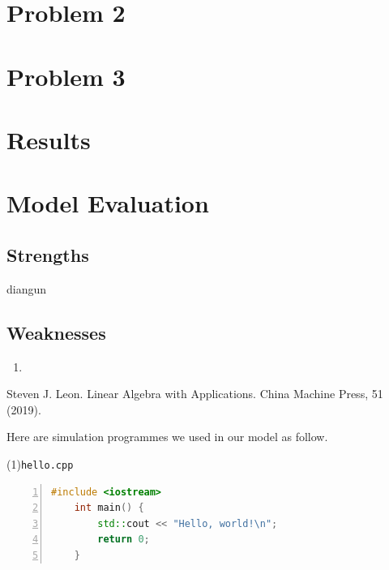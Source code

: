 \documentclass[UTF8]{mcmthesis}
\begin{document}
    \section{Problem 2}
    \section{Problem 3}
    \section{Results}
    \section{Model Evaluation}
        \subsection{Strengths}
diangun
            
        \subsection{Weaknesses}
            \begin{enumerate}
                \item 
            \end{enumerate}


        \begin{thebibliography}{99}
            Steven J. Leon.
            Linear Algebra with Applications.
            China Machine Press, 51 (2019).
        \end{thebibliography}


    \begin{appendices}
        Here are simulation programmes we used in our model as follow.
        
        \vspace{.5em}
        \noindent(1)\quad \verb|hello.cpp|
        \vspace{.5em}
        \begin{lstlisting}[language = c++, numbers = left]
    #include <iostream>
    int main() {
        std::cout << "Hello, world!\n";
        return 0;
    }
        \end{lstlisting}

    \end{appendices}
\end{document}
